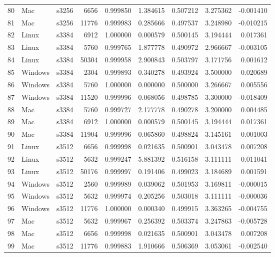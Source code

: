 \documentclass{IEEEtran}
\begin{document}
\begin{longtable}{rllrrrrrr}
  80 & Mac & s3256 &    6656 & 0.999850 & 1.384615 & 0.507212 & 3.275362 & -0.001410 \\ 
  81 & Mac & s3256 &   11776 & 0.999983 & 0.285666 & 0.497537 & 3.248980 & -0.010215 \\ 
  82 & Linux & s3384 &    6912 & 1.000000 & 0.000579 & 0.500145 & 3.194444 & 0.017361 \\ 
  83 & Linux & s3384 &    5760 & 0.999765 & 1.877778 & 0.490972 & 2.966667 & -0.003105 \\ 
  84 & Linux & s3384 &   50304 & 0.999958 & 2.900843 & 0.503797 & 3.171756 & 0.001612 \\ 
  85 & Windows & s3384 &    2304 & 0.999893 & 0.340278 & 0.493924 & 3.500000 & 0.020689 \\ 
  86 & Windows & s3384 &    5760 & 1.000000 & 0.000000 & 0.500000 & 3.266667 & 0.005556 \\ 
  87 & Windows & s3384 &   11520 & 0.999996 & 0.068056 & 0.498785 & 3.300000 & -0.018409 \\ 
  88 & Mac & s3384 &    5760 & 0.999727 & 2.177778 & 0.490278 & 3.200000 & 0.004485 \\ 
  89 & Mac & s3384 &    6912 & 1.000000 & 0.000579 & 0.500145 & 3.194444 & 0.017361 \\ 
  90 & Mac & s3384 &   11904 & 0.999996 & 0.065860 & 0.498824 & 3.145161 & 0.001003 \\ 
  91 & Linux & s3512 &    6656 & 0.999998 & 0.021635 & 0.500901 & 3.043478 & 0.007208 \\ 
  92 & Linux & s3512 &    5632 & 0.999247 & 5.881392 & 0.516158 & 3.111111 & 0.011041 \\ 
  93 & Linux & s3512 &   50176 & 0.999997 & 0.191406 & 0.499023 & 3.184689 & 0.001591 \\ 
  94 & Windows & s3512 &    2560 & 0.999989 & 0.039062 & 0.501953 & 3.169811 & -0.000015 \\ 
  95 & Windows & s3512 &    5632 & 0.999974 & 0.205256 & 0.503018 & 3.111111 & -0.000036 \\ 
  96 & Windows & s3512 &   11776 & 1.000000 & 0.000340 & 0.499915 & 3.363265 & -0.004755 \\ 
  97 & Mac & s3512 &    5632 & 0.999967 & 0.256392 & 0.503374 & 3.247863 & -0.005728 \\ 
  98 & Mac & s3512 &    6656 & 0.999998 & 0.021635 & 0.500901 & 3.043478 & 0.007208 \\ 
  99 & Mac & s3512 &   11776 & 0.999883 & 1.910666 & 0.506369 & 3.053061 & -0.002540 \\ 

\end{longtable}
\end{document}
